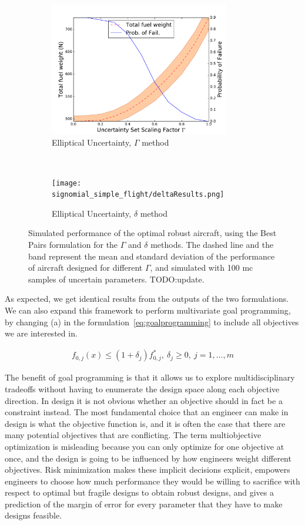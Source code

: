 \begin{figure}[ht]
    \centering
    \captionsetup{justification=centering, font=small}
    \begin{subfigure}{0.49\textwidth}
        \centering
        \includegraphics[height=2.3in]{signomial_simple_flight/ell_best_pairs.pdf}
         \caption{Elliptical Uncertainty, $\Gamma$ method}
    \end{subfigure}%
    ~
    \begin{subfigure}{0.49\textwidth}
        \centering
        \texttt{[image: signomial\_simple\_flight/deltaResults.png]}
         \caption{Elliptical Uncertainty, $\delta$ method}
    \end{subfigure}
    \caption{Simulated performance of the optimal robust aircraft, using the Best Pairs formulation
    for the $\Gamma$ and $\delta$ methods.
    The dashed line and the band represent the mean and standard deviation of the performance
    of aircraft designed for different $\Gamma$,
    and simulated with 100 \gls{mc} samples of uncertain parameters. TODO:update.}
    \label{fig:deltaVsGamma}
\end{figure}

As expected, we get identical results from the outputs of the two formulations.
We can also expand this framework to perform multivariate goal programming,
by changing (a) in the formulation~\ref{eq:goalprogramming} to include all
objectives we are interested in.

\begin{align*}
    f_{0,j}(x) \leq (1+\delta_j) f^*_{0,j},~\delta_j \geq 0,~j = 1,\ldots, m
    \label{eq:multigoal}
\end{align*}

The benefit of goal programming is that it allows us to explore multidisciplinary tradeoffs without
having to enumerate the design space along each objective direction.
In design it is not obvious whether an objective should in fact be a constraint instead. The most
fundamental choice that an engineer can make in design is what the objective function is, and it is
often the case that there are many potential objectives that are conflicting.
The term multiobjective optimization is misleading
because you can only optimize for one objective at once,
and the design is going to be influenced by how engineers weight different objectives.
Risk minimization makes these implicit decisions explicit, empowers engineers to choose
how much performance they would be willing to sacrifice with respect
to optimal but fragile designs to obtain robust designs, and gives a prediction of the margin of error
for every parameter that they have to make designs feasible.

